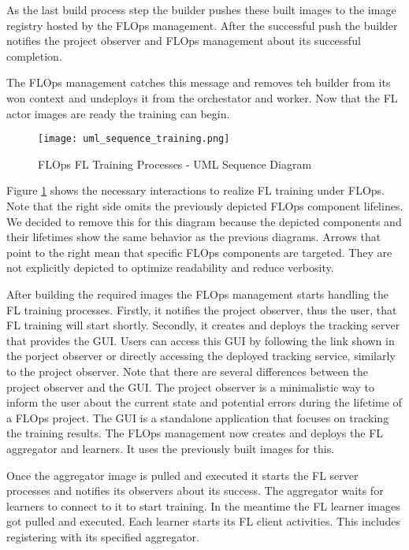 As the last build process step the builder pushes these built images to the image registry hosted by the FLOps management.
After the successful push the builder notifies the project observer and FLOps management about its successful completion.

The FLOps management catches this message and removes teh builder from its won context and undeploys it from the orchestator and worker.
Now that the FL actor images are ready the training can begin.

\begin{figure}[h]
    \begin{adjustwidth}{-0.2\paperwidth}{-0.2\paperwidth}
        \centering
        \texttt{[image: uml\_sequence\_training.png]}
        \caption{FLOps FL Training Processes - UML Sequence Diagram}
        \label{fig:uml_sequence_training}
    \end{adjustwidth}
\end{figure}

Figure \ref{fig:uml_sequence_training} shows the necessary interactions to realize FL training under FLOps.
Note that the right side omits the previously depicted FLOps component lifelines.
We decided to remove this for this diagram because the depicted components and their lifetimes show the same behavior as the previous diagrams.
Arrows that point to the right mean that specific FLOps components are targeted.
They are not explicitly depicted to optimize readability and reduce verbosity.

After building the required images the FLOps management starts handling the FL training processes.
Firstly, it notifies the project observer, thus the user, that FL training will start shortly.
Secondly, it creates and deploys the tracking server that provides the GUI.
Users can access this GUI by following the link shown in the porject observer or directly accessing the deployed tracking service, similarly to the project observer.
Note that there are several differences between the project observer and the GUI.
The project observer is a minimalistic way to inform the user about the current state and potential errors during the lifetime of a FLOps project.
The GUI is a standalone application that focuses on tracking the training results.
The FLOps management now creates and deploys the FL aggregator and learners.
It uses the previously built images for this.

Once the aggregator image is pulled and executed it starts the FL server processes and notifies its observers about its success.
The aggregator waits for learners to connect to it to start training.
In the meantime the FL learner images got pulled and executed.
Each learner starts its FL client activities.
This includes registering with its specified aggregator.

